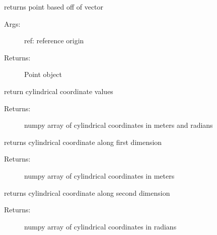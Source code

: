 \documentclass[letterpaper,10pt,english]{sphinxmanual}
\begin{document}
\begin{fulllineitems}
\begin{fulllineitems}
\label{TRIPPy:TRIPPy.geometry.Vec.point}
returns point based off of vector
\begin{description}
\item[{Args:}] \leavevmode
ref: reference origin

\item[{Returns:}] \leavevmode
Point object

\end{description}

\end{fulllineitems}


\begin{fulllineitems}
\label{TRIPPy:TRIPPy.geometry.Vec.r}
return cylindrical coordinate values
\begin{description}
\item[{Returns:}] \leavevmode
numpy array of cylindrical coordinates in meters and radians

\end{description}

\end{fulllineitems}


\begin{fulllineitems}
\label{TRIPPy:TRIPPy.geometry.Vec.r0}
returns cylindrical coordinate along first dimension
\begin{description}
\item[{Returns:}] \leavevmode
numpy array of cylindrical coordinates in meters

\end{description}

\end{fulllineitems}


\begin{fulllineitems}
\label{TRIPPy:TRIPPy.geometry.Vec.r1}
returns cylindrical coordinate along second dimension
\begin{description}
\item[{Returns:}] \leavevmode
numpy array of cylindrical coordinates in radians


\end{description}
\end{fulllineitems}
\end{fulllineitems}
\end{document}
